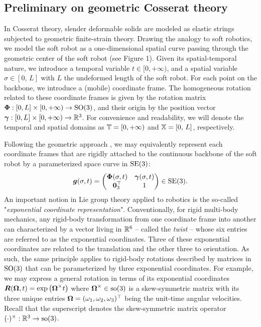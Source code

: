 \subsection{Preliminary on geometric Cosserat theory}
In Cosserat theory, slender deformable solids are modeled as elastic strings subjected to geometric finite-strain theory. Drawing the analogy to soft robotics, we model the soft robot as a one-dimensional spatial curve passing through the geometric center of the soft robot (see Figure 1). Given its spatial-temporal nature, we introduce a temporal variable $t \in [0,+\infty)$, and a spatial variable $\sigma \in [0,\,L]$ with $L$ the undeformed length of the soft robot. For each point on the backbone, we introduce a (mobile) coordinate frame. The homogeneous rotation related to these coordinate frames is given by the rotation matrix $\boldsymbol{\Phi}: [0,L] \times [0,+\infty) \to  \textup{\textrm{SO}}(3)$, and their origin by the position vector $\boldsymbol{\gamma}: [0,L] \times [0,+\infty) \to \mathbb{R}^3$. For convenience and readability, we will denote the temporal and spatial domains as $\mathbb{T} = [0,+\infty)$ and $\mathbb{X} = [0,\,L]$, respectively.

Following the geometric approach \cite{Simo1986,Boyer2010,Boyer2021,Renda2018,Renda2020}, we may equivalently represent each coordinate frames that are rigidly attached to the continuous backbone of the soft robot by a parameterized space curve in $\textup{\textrm{SE}}(3)$:
%
\begin{equation}
\boldsymbol{g}(\sigma,t) = \begin{pmatrix} \boldsymbol{\Phi}(\sigma,t) & \boldsymbol{\gamma}(\sigma,t) \\ \boldsymbol{0}_3^\top & 1 \end{pmatrix} \in \textup{\textrm{SE}}(3).
\label{eq:C3:backbone}
\end{equation}
%
An important notion in Lie group theory applied to robotics is the so-called "\textit{exponential coordinate representation}". Conventionally, for rigid multi-body mechanics, any rigid-body transformation from one coordinate frame into another can characterized by a vector living in $\mathbb{R}^6$ -- called the \textit{twist} -- whose six entries are referred to as the exponential coordinates. Three of these exponential coordinates are related to the translation and the other three to orientation. As such, the same principle applies to rigid-body rotations described by matrices in $\textup{\textrm{SO}}(3)$ that can be parameterized by three exponential coordinates. For example, we may express a general rotation in terms of its exponential coordinates ${\boldsymbol{R}}(\boldsymbol{\Omega},t) = \exp\left( {\boldsymbol{\Omega}}^\times t \right)$ where $\boldsymbol{\Omega}^\times \in \textup{\textrm{so}}(3)$ is a skew-symmetric matrix with its three unique entries $\boldsymbol{\Omega} = (\omega_1,\omega_2,\omega_3)^\top$ being the unit-time angular velocities. Recall that the superscript denotes the skew-symmetric matrix operator $(\cdot)^\times:\mathbb{R}^3 \to \textup{\textrm{so}}(3)$. %


